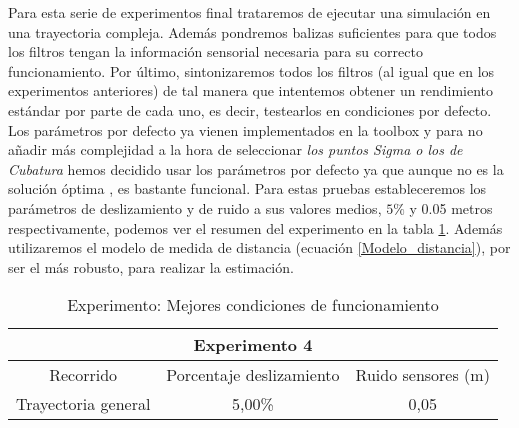 Para esta serie de experimentos final trataremos de ejecutar una simulación en una trayectoria compleja.
Además pondremos balizas suficientes para que todos los filtros tengan la información sensorial necesaria para su correcto funcionamiento.
Por último, sintonizaremos todos los filtros (al igual que en los experimentos anteriores) de tal manera que intentemos obtener un rendimiento estándar por parte de cada uno, es decir, testearlos en condiciones por defecto.
Los parámetros por defecto ya vienen implementados en la toolbox \cite{toolbox_simo} y para no añadir más complejidad a la hora de seleccionar \textit{los puntos Sigma o los de Cubatura } hemos decidido usar los parámetros por defecto ya que aunque no es la solución óptima , es bastante funcional.
%
%
%
%
%
%
%
%
%
%
Para estas pruebas estableceremos los parámetros de deslizamiento y de ruido a sus valores medios, $5\%$ y 0.05 metros respectivamente, podemos ver el resumen del experimento en la tabla \ref{exp_Mejorescondiciones}.
Además utilizaremos el modelo de medida de distancia (ecuación \ref{Modelo_distancia}), por ser el más robusto, para realizar la estimación.

\begin{table}[htbp]
\caption{Experimento: Mejores condiciones de funcionamiento}
\begin{center}
\begin{tabular}{|c|c|c|c|}
\hline
\multicolumn{ 4}{|c|}{Experimento 4} \\ \hline
Recorrido & Porcentaje deslizamiento & \multicolumn{ 2}{c|}{Ruido sensores (m)} \\ \hline
\multicolumn{1}{|l|}{Trayectoria general} & 5,00\% & \multicolumn{ 2}{c|}{0,05} \\ \hline
\end{tabular}
\end{center}
\label{exp_Mejorescondiciones}
\end{table}

